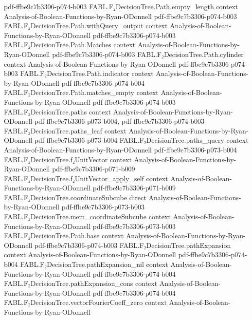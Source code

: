 \begin{theorem}
  {pdf-ffbe9c7b3306-p074-b003}
\proofstep
  {FABL.F₂DecisionTree.Path.empty_length}
  {context}
  {Analysis-of-Boolean-Functions-by-Ryan-ODonnell}
  {pdf-ffbe9c7b3306-p074-b003}
\proofstep
  {FABL.F₂DecisionTree.Path.withQuery_output}
  {context}
  {Analysis-of-Boolean-Functions-by-Ryan-ODonnell}
  {pdf-ffbe9c7b3306-p074-b003}
\proofstep
  {FABL.F₂DecisionTree.Path.Matches}
  {context}
  {Analysis-of-Boolean-Functions-by-Ryan-ODonnell}
  {pdf-ffbe9c7b3306-p074-b003}
\proofstep
  {FABL.F₂DecisionTree.Path.cylinder}
  {context}
  {Analysis-of-Boolean-Functions-by-Ryan-ODonnell}
  {pdf-ffbe9c7b3306-p074-b003}
\proofstep
  {FABL.F₂DecisionTree.Path.indicator}
  {context}
  {Analysis-of-Boolean-Functions-by-Ryan-ODonnell}
  {pdf-ffbe9c7b3306-p074-b004}
\proofstep
  {FABL.F₂DecisionTree.Path.matches_empty}
  {context}
  {Analysis-of-Boolean-Functions-by-Ryan-ODonnell}
  {pdf-ffbe9c7b3306-p074-b003}
\proofstep
  {FABL.F₂DecisionTree.paths}
  {context}
  {Analysis-of-Boolean-Functions-by-Ryan-ODonnell}
  {pdf-ffbe9c7b3306-p073-b004,
    pdf-ffbe9c7b3306-p074-b003}
\proofstep
  {FABL.F₂DecisionTree.paths_leaf}
  {context}
  {Analysis-of-Boolean-Functions-by-Ryan-ODonnell}
  {pdf-ffbe9c7b3306-p073-b004}
\proofstep
  {FABL.F₂DecisionTree.paths_query}
  {context}
  {Analysis-of-Boolean-Functions-by-Ryan-ODonnell}
  {pdf-ffbe9c7b3306-p073-b004}
\proofstep
  {FABL.F₂DecisionTree.f₂UnitVector}
  {context}
  {Analysis-of-Boolean-Functions-by-Ryan-ODonnell}
  {pdf-ffbe9c7b3306-p071-b009}
\proofstep
  {FABL.F₂DecisionTree.f₂UnitVector_apply_self}
  {context}
  {Analysis-of-Boolean-Functions-by-Ryan-ODonnell}
  {pdf-ffbe9c7b3306-p071-b009}
\proofstep
  {FABL.F₂DecisionTree.coordinateSubcube}
  {direct}
  {Analysis-of-Boolean-Functions-by-Ryan-ODonnell}
  {pdf-ffbe9c7b3306-p073-b003}
\proofstep
  {FABL.F₂DecisionTree.mem_coordinateSubcube}
  {context}
  {Analysis-of-Boolean-Functions-by-Ryan-ODonnell}
  {pdf-ffbe9c7b3306-p073-b003}
\proofstep
  {FABL.F₂DecisionTree.Path.base}
  {context}
  {Analysis-of-Boolean-Functions-by-Ryan-ODonnell}
  {pdf-ffbe9c7b3306-p074-b003}
\proofstep
  {FABL.F₂DecisionTree.pathExpansion}
  {context}
  {Analysis-of-Boolean-Functions-by-Ryan-ODonnell}
  {pdf-ffbe9c7b3306-p074-b004}
\proofstep
  {FABL.F₂DecisionTree.pathExpansion_nil}
  {context}
  {Analysis-of-Boolean-Functions-by-Ryan-ODonnell}
  {pdf-ffbe9c7b3306-p074-b004}
\proofstep
  {FABL.F₂DecisionTree.pathExpansion_cons}
  {context}
  {Analysis-of-Boolean-Functions-by-Ryan-ODonnell}
  {pdf-ffbe9c7b3306-p074-b004}
\proofstep
  {FABL.F₂DecisionTree.vectorFourierCoeff_zero}
  {context}
  {Analysis-of-Boolean-Functions-by-Ryan-ODonnell}

\end{theorem}
